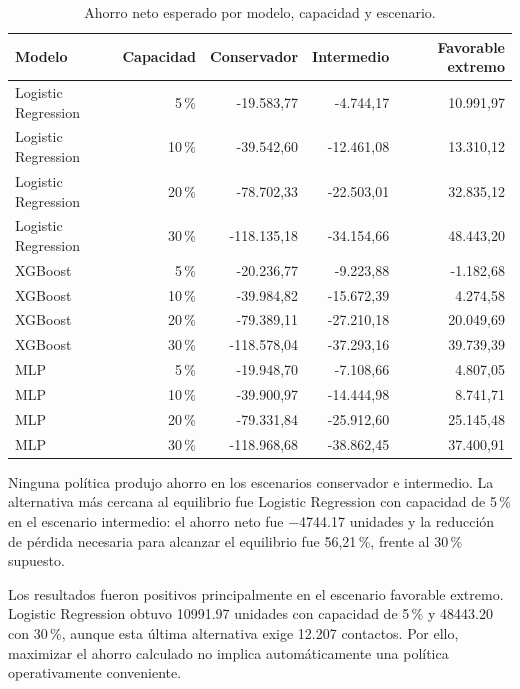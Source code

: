 \begin{table}[htbp]
    \centering
    \small
    \caption{Ahorro neto esperado por modelo, capacidad y escenario.}
    \label{tab:economic-net-savings}
    \begin{tabular}{lrrrr}
        \toprule
        Modelo & Capacidad & Conservador & Intermedio & Favorable extremo \\
        \midrule
        Logistic Regression & 5\,\%  & -19.583,77 & -4.744,17  & 10.991,97 \\
        Logistic Regression & 10\,\% & -39.542,60 & -12.461,08 & 13.310,12 \\
        Logistic Regression & 20\,\% & -78.702,33 & -22.503,01 & 32.835,12 \\
        Logistic Regression & 30\,\% & -118.135,18 & -34.154,66 & 48.443,20 \\
        \addlinespace
        XGBoost & 5\,\%  & -20.236,77 & -9.223,88  & -1.182,68 \\
        XGBoost & 10\,\% & -39.984,82 & -15.672,39 & 4.274,58 \\
        XGBoost & 20\,\% & -79.389,11 & -27.210,18 & 20.049,69 \\
        XGBoost & 30\,\% & -118.578,04 & -37.293,16 & 39.739,39 \\
        \addlinespace
        MLP & 5\,\%  & -19.948,70 & -7.108,66  & 4.807,05 \\
        MLP & 10\,\% & -39.900,97 & -14.444,98 & 8.741,71 \\
        MLP & 20\,\% & -79.331,84 & -25.912,60 & 25.145,48 \\
        MLP & 30\,\% & -118.968,68 & -38.862,45 & 37.400,91 \\
        \bottomrule
    \end{tabular}
\end{table}

Ninguna política produjo ahorro en los escenarios conservador e intermedio.
La alternativa más cercana al equilibrio fue Logistic Regression con capacidad
de 5\,\% en el escenario intermedio: el ahorro neto fue
\SI{-4744,17}{} unidades y la reducción de pérdida necesaria para alcanzar el
equilibrio fue 56,21\,\%, frente al 30\,\% supuesto.

Los resultados fueron positivos principalmente en el escenario favorable
extremo. Logistic Regression obtuvo \SI{10991,97}{} unidades con capacidad de
5\,\% y \SI{48443,20}{} con 30\,\%, aunque esta última alternativa exige
12.207 contactos. Por ello, maximizar el ahorro calculado no implica
automáticamente una política operativamente conveniente.

